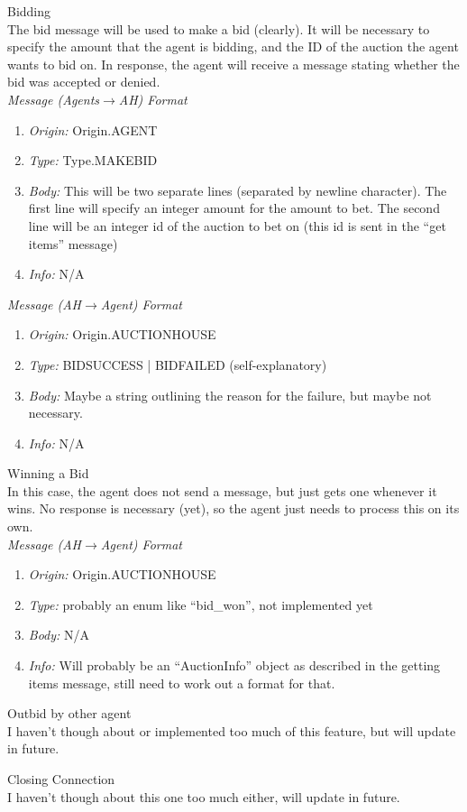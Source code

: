 \documentclass{article}
\begin{document}
\large
Bidding 
\normalsize
\\ The bid message will be used to make a bid (clearly). It will be necessary to specify the amount that the agent is bidding, and the ID of the auction the agent wants to bid on. In response, the agent will receive a message stating whether the bid was accepted or denied. 
\footnotesize
\\\emph{Message (Agents$\to$AH) Format} 
\begin{enumerate} 
	\item[]\emph{Origin:} Origin.AGENT
	\item[]\emph{Type: } Type.MAKEBID 
	\item[]\emph{Body: } This will be two separate lines (separated by newline character). The first line will specify an integer amount for the amount to bet. The second line will be an integer id of the auction to bet on (this id is sent in the ``get items'' message)
	\item[]\emph{Info:} N/A 
\end{enumerate}
\emph{Message (AH$\to$Agent) Format} 
\begin{enumerate}
	\item[]\emph{Origin:} Origin.AUCTIONHOUSE
	\item[]\emph{Type:} BIDSUCCESS | BIDFAILED (self-explanatory) 
	\item[]\emph{Body:} Maybe a string outlining the reason for the failure, but maybe not necessary. 
	\item[]\emph{Info:} N/A 
\end{enumerate} 


\clearpage


\large
Winning a Bid 
\normalsize
\\ In this case, the agent does not send a message, but just gets one whenever it wins. No response is necessary (yet), so the agent just needs to process this on its own. 
\footnotesize
\\\emph{Message (AH$\to$Agent) Format} 
\begin{enumerate} 
	\item[]\emph{Origin:} Origin.AUCTIONHOUSE
	\item[]\emph{Type:} probably an enum like ``bid\_won'', not implemented yet 
	\item[]\emph{Body:} N/A 
	\item[]\emph{Info:} Will probably be an ``AuctionInfo'' object as described in the getting items message, still need to work out a format for that. 
\end{enumerate}

\vspace{1cm} 

\large
Outbid by other agent 
\normalsize
\\ I haven't though about or implemented too much of this feature, but will update in future. 

\vspace{1cm}

\large
Closing Connection 
\normalsize
\\ I haven't though about this one too much either, will update in future. 
\end{document}
